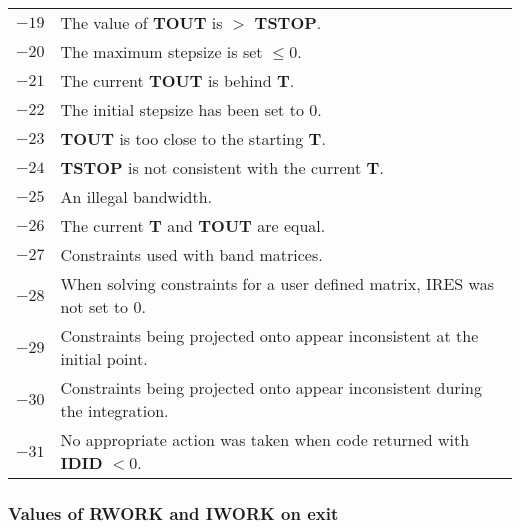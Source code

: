 \documentclass[twoside]{MATH77}
\begin{document}
\begin{tabular}{rp{2.8in}}
  $-19$ & The value of \textbf{TOUT} is $>$ \textbf{TSTOP}.\\
  $-20$ & The maximum stepsize is set $\leq 0$.\\
  $-21$ & The current \textbf{TOUT} is behind \textbf{T}.\\
  $-22$ & The initial stepsize has been set to 0.\\
  $-23$ & \textbf{TOUT} is too close to the starting \textbf{T}.\\
  $-24$ & \textbf{TSTOP} is not consistent with the current \textbf{T}.\\
  $-25$ & An illegal bandwidth.\\
  $-26$ & The current \textbf{T} and \textbf{TOUT} are equal.\\
  $-27$ & Constraints used with band matrices.\\
  $-28$ & When solving constraints for a user defined matrix, IRES was not set
  to 0.\\
  $-29$ & Constraints being projected onto appear inconsistent at the
  initial point.\\
  $-30$ & Constraints being projected onto appear inconsistent during
  the integration.\\
  $-31$ & No appropriate action was taken when code returned with \textbf{IDID}
  $< 0$.\\
\end{tabular}

\subsubsection{Values of \textbf{RWORK} and \textbf{IWORK} on
  exit\label{WORKS_val}}
\end{document}
